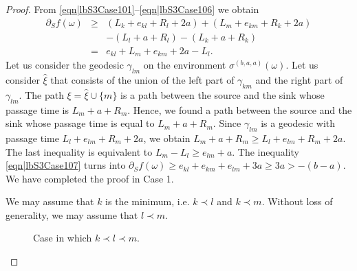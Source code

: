 \documentclass[10pt,a4paper]{amsart}
\begin{document}
\begin{proof}
From \eqref{eqn|lbS3Case101}--\eqref{eqn|lbS3Case106} we obtain 
\begin{eqnarray}
\partial_Sf(\omega)&\geq& (L_k+e_{kl}+R_l+2a) + (L_m+e_{km}+R_k+2a) \nonumber\\
&&-(L_l+a+R_l)-(L_k+a+R_k) \nonumber \\
&=& e_{kl}   + L_m+e_{km}+ 2a 
-L_l. \label{eqn|lbS3Case107}
\end{eqnarray}
Let us consider the geodesic $\gamma_{lm}$ on the environment $\sigma^{(b,a,a)}(\omega)$. Let us consider $\hat \xi$ 
that consists of the union of the left part of $\gamma_{km}$ and the right part of $\gamma_{lm}$. 
The path $\xi=\hat\xi\cup\{m\}$ is a path between the source and the sink whose passage 
time is $L_m+a+R_m$.  Hence, we found a path between the source and the 
sink whose passage time is equal to $L_m+a+R_m$. Since $\gamma_{lm}$ is a geodesic with passage time 
$L_l+e_{lm}+R_m+2a$, we obtain
$L_m+a+R_m \geq L_l+e_{lm}+R_m+2a$. The last inequality is equivalent to $L_m-L_l\geq e_{lm}+a$. The inequality \eqref{eqn|lbS3Case107} turns into 
$\partial_Sf(\omega)\geq e_{kl}+e_{km}+e_{lm}+3a\geq 3a>-(b-a)$. We have completed the proof in Case 1. 

 
 We may assume that $k$ is the minimum, i.e. $k\prec l$ and $k\prec m$. Without loss of generality, we may assume that $l\prec m$. 

 \begin{figure}[t]
 \centering
{}
\caption{Case in which $k\prec l\prec m$.}
\label{fig|lowerBound3TriangleNoAlLRA}
\end{figure}


\end{proof}
\end{document}
